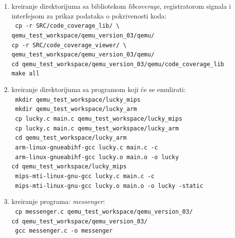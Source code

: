 \documentclass[12pt,oneside]{memoir}
\newcommand{\kod}[1]{\texttt{#1}}
\newcommand{\strano}[1]{\textit{#1}}
\begin{document}
\begin{enumerate}
\item kreiranje direktorijuma sa bibliotekom \strano{libcoverage}, registratorom signala i interfejsom za prikaz podataka o pokrivenosti koda: \\
\kod{ cp -r SRC/code\_coverage\_lib/ \textbackslash } \\
\hspace*{6mm} \kod{qemu\_test\_workspace/qemu\_version\_03/qemu/} \\
\kod{cp -r SRC/code\_coverage\_viewer/ \textbackslash } \\
\hspace*{6mm} \kod{qemu\_test\_workspace/qemu\_version\_03/qemu/} \\
\kod{cd qemu\_test\_workspace/qemu\_version\_03/qemu/code\_coverage\_lib} \\
\kod{make all}
\item kreiranje direktorijuma sa programom koji će se emulirati: \\
\kod{ mkdir qemu\_test\_workspace/lucky\_mips} \\
\kod{ mkdir qemu\_test\_workspace/lucky\_arm} \\
\kod{ cp lucky.c main.c qemu\_test\_workspace/lucky\_mips} \\
\kod{ cp lucky.c main.c qemu\_test\_workspace/lucky\_arm} \\
\kod{ cd qemu\_test\_workspace/lucky\_arm} \\
\kod{ arm-linux-gnueabihf-gcc lucky.c main.c -c} \\
\kod{ arm-linux-gnueabihf-gcc lucky.o main.o -o lucky} \\
\kod{cd qemu\_test\_workspace/lucky\_mips} \\
\kod{ mips-mti-linux-gnu-gcc lucky.c main.c -c} \\
\kod{ mips-mti-linux-gnu-gcc lucky.o main.o -o lucky -static} 
\item kreiranje programa: \strano{messenger}: \\
\kod{ cp messenger.c qemu\_test\_workspace/qemu\_version\_03/} \\
\kod{cd qemu\_test\_workspace/qemu\_version\_03/} \\
\kod{ gcc messenger.c -o messenger}
\end{enumerate}
\end{document}

